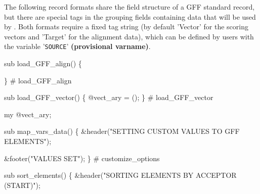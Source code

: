 \documentclass[11pt]{article}
\def\nwendcode{\endtrivlist \endgroup} %
\let\nwdocspar=\par                    %
\begin{document}

The following record formats share the field structure of a GFF standard record, but there are special tags in the grouping fields containing data that will be used by {\prog}. Both formats require a fixed tag string (by default 'Vector' for the scoring vectors and 'Target' for the alignment data), which can be defined by users with the variable '{\tt{}{}SOURCE}' \textbf{(provisional varname)}.


\nwenddocs{}\plusendmoddef
sub load_GFF_align() \{

\} # load_GFF_align
\nwendcode{}\nwdocspar

 \label{sec:loadvector}

\nwenddocs{}\plusendmoddef
sub load_GFF_vector() \{
    @vect_ary = ();
\} # load_GFF_vector
\nwendcode{}\nwdocspar

\nwenddocs{}\plusendmoddef
my @vect_ary;
\nwendcode{}\nwdocspar


\nwenddocs{}\endmoddef
sub map_vars_data() \{
    &header("SETTING CUSTOM VALUES TO GFF ELEMENTS");

    &footer("VALUES SET");
\} # customize_options
\nwendcode{}\nwdocspar


\nwenddocs{}\endmoddef
sub sort_elements() \{
    &header("SORTING ELEMENTS BY ACCEPTOR (START)");
\end{document}
